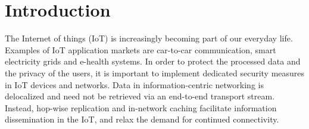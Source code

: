 \section{Introduction}

The Internet of things (IoT) is increasingly becoming part of our
everyday life. Examples of IoT application markets are car-to-car
communication, smart electricity grids and e-health systems. In
order to protect the processed data and the privacy of the users, it is important to implement dedicated security measures in IoT devices
and networks. 
Data in information-centric networking is delocalized and
need not be retrieved via an end-to-end transport stream.
Instead, hop-wise replication and in-network caching facilitate
information dissemination in the IoT, and relax the
demand for continued connectivity. 